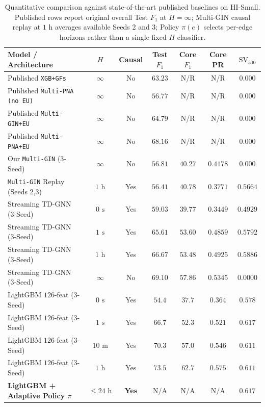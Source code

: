 \documentclass[pdflatex,sn-mathphys,Numbered]{sn-jnl}
\theoremstyle{thmstyleone}
\begin{document}
\begin{table}[t]
\centering
\caption{Quantitative comparison against state-of-the-art published baselines on HI-Small. Published rows report original overall Test $F_1$ at $H = \infty$; Multi-GIN causal replay at $1\text{ h}$ averages available Seeds 2 and 3; Policy $\pi(e)$ selects per-edge horizons rather than a single fixed-$H$ classifier.}
\label{tab:sota_quantitative}
\scriptsize
\setlength{\tabcolsep}{2.2pt}
\begin{tabular}{@{}lcccccc@{}}
\toprule
\textbf{Model / Architecture} & \textbf{$H$} & \textbf{Causal} & \textbf{Test $F_1$} & \textbf{Core $F_1$} & \textbf{Core PR} & \textbf{$\text{SV}_{500}$} \\
\midrule
Published \texttt{XGB+GFs}~\cite{egressy2024multigraph} & $\infty$ & No & $63.23$ & N/R & N/R & $0.000$ \\
Published \texttt{Multi-PNA (no EU)}~\cite{altman2023ibmaml} & $\infty$ & No & $56.77$ & N/R & N/R & $0.000$ \\
Published \texttt{Multi-GIN+EU}~\cite{egressy2024multigraph} & $\infty$ & No & $64.79$ & N/R & N/R & $0.000$ \\
Published \texttt{Multi-PNA+EU}~\cite{egressy2024multigraph} & $\infty$ & No & $68.16$ & N/R & N/R & $0.000$ \\
\midrule
Our \texttt{Multi-GIN} (3-Seed) & $\infty$ & No & $56.81$ & $40.27$ & $0.4178$ & $0.000$ \\
\texttt{Multi-GIN} Replay (Seeds 2,3) & $1\text{ h}$ & Yes & $56.41$ & $40.78$ & $0.3771$ & $0.5664$ \\
\midrule
Streaming TD-GNN (3-Seed) & $0\text{ s}$ & Yes & $59.03$ & $39.77$ & $0.3449$ & $0.4929$ \\
Streaming TD-GNN (3-Seed) & $1\text{ s}$ & Yes & $65.61$ & $53.60$ & $0.4859$ & $0.5792$ \\
Streaming TD-GNN (3-Seed) & $1\text{ h}$ & Yes & $66.67$ & $53.48$ & $0.4925$ & $0.5886$ \\
Streaming TD-GNN (3-Seed) & $\infty$ & No & $69.10$ & $57.86$ & $0.5345$ & $0.0000$ \\
\midrule
LightGBM $126$-feat (3-Seed) & $0\text{ s}$ & Yes & $54.4$ & $37.7$ & $0.364$ & $0.578$ \\
LightGBM $126$-feat (3-Seed) & $1\text{ s}$ & Yes & $66.7$ & $52.3$ & $0.521$ & $0.617$ \\
LightGBM $126$-feat (3-Seed) & $10\text{ m}$ & Yes & $70.3$ & $57.0$ & $0.546$ & $0.611$ \\
LightGBM $126$-feat (3-Seed) & $1\text{ h}$ & Yes & $\mathbf{73.5}$ & $\mathbf{62.7}$ & $\mathbf{0.575}$ & $0.611$ \\
\textbf{LightGBM + Adaptive Policy $\pi$} & $\le 24\text{ h}$ & \textbf{Yes} & N/A & N/A & N/A & $\mathbf{0.617}$ \\
\bottomrule
\end{tabular}
\end{table}
\end{document}
